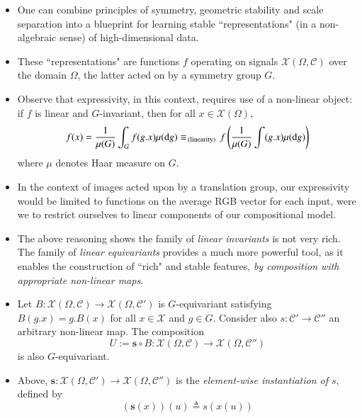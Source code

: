 \documentclass[12pt]{article}
\numberwithin{equation}{section}
\theoremstyle{definition}
\newcommand{		\1		}	{	\bm{1}					}%
\begin{document}
\begin{itemize}
\item One can combine principles of symmetry, geometric stability and scale separation into a blueprint for learning stable ``representations" (in a non-algebraic sense) of high-dimensional data. 

\item These ``representations" are functions $f$ operating on signals $\mathcal{X}(\Omega, \mathcal{C})$ over the domain $\Omega$, the latter acted on by a symmetry group $G$.

\item Observe that expressivity, in this context, requires use of a non-linear object: if $f$ is linear and $G$-invariant, then for all $x \in \mathcal{X}(\Omega)$,
    $$
    f(x) = \frac{1}{\mu(G)} \int_G f (g.x) \mu( \textrm{d} g )  \\
     \equiv_{\,(\textrm{linearity})\,} f \left( \frac{1} { \mu(G) }\int (g.x) \mu (\textrm{d}g) \right)
    $$
    where $\mu$ denotes Haar measure on $G$.
    
\item In the context of images acted upon by a translation group, our expressivity would be limited to functions on the average RGB vector for each input, were we to restrict ourselves to linear components of our compositional model. 

\item The above reasoning shows the family of \emph{linear invariants} is not very rich. The family of \emph{linear equivariants} provides a much more powerful tool, as it enables the construction of ``rich" and stable features, \emph{by composition with appropriate non-linear maps}. 

\item Let $B : \mathcal{X}(\Omega, \mathcal{C}) \to \mathcal{X}(\Omega, \mathcal{C}') $ is $G$-equivariant satisfying $B(g.x) = g.B(x)$ for all $x \in \mathcal{X}$ and $g \in G$. Consider also $s: \mathcal{C}' \to \mathcal{C}''$ an arbitrary non-linear map. The composition 
    $$
    U := \mathbf{s} \circ B : \mathcal{X}(\Omega, \mathcal{C}) \to \mathcal{X} (\Omega, \mathcal{C}'')
    $$
    is also $G$-equivariant.

\item Above, $\mathbf{s} : \mathcal{X}(\Omega, \mathcal{C}') \to \mathcal{X}(\Omega, \mathcal{C}'')$ is the \emph{element-wise instantiation of $s$}, defined by 
    $$
    ( \mathbf{s} (x) )(u) \triangleq s( x (u ))
    $$
    


\end{itemize}
\end{document}
